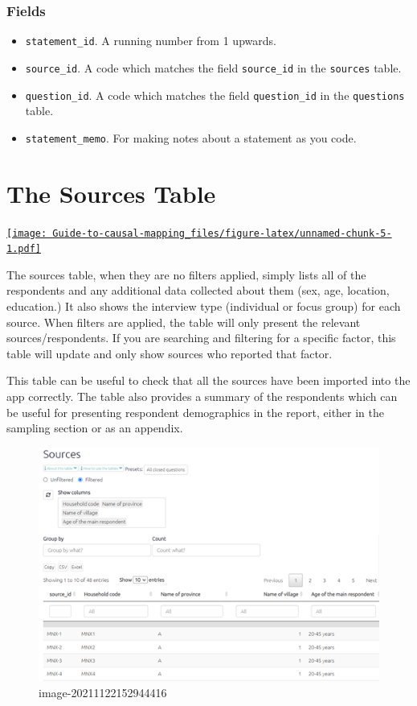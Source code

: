 \documentclass[
]{book}
\providecommand{\tightlist}{%
  \setlength{\itemsep}{0pt}\setlength{\parskip}{0pt}}
\begin{document}
\hypertarget{fields-1}{%
\subsection{Fields}\label{fields-1}}

\begin{itemize}
\tightlist
\item
  \texttt{statement\_id}. A running number from 1 upwards.
\item
  \texttt{source\_id}. A code which matches the field \texttt{source\_id} in the \texttt{sources} table.
\item
  \texttt{question\_id}. A code which matches the field \texttt{question\_id} in the \texttt{questions} table.
\item
  \texttt{statement\_memo}. For making notes about a statement as you code.
\end{itemize}

\hypertarget{xthe-sources-table}{%
\chapter{The Sources Table}\label{xthe-sources-table}}

\href{https://player.vimeo.com/video/596519456}{\texttt{[image: Guide-to-causal-mapping\_files/figure-latex/unnamed-chunk-5-1.pdf]}}

The sources table, when they are no filters applied, simply lists all of the respondents and any additional data collected about them (sex, age, location, education.) It also shows the interview type (individual or focus group) for each source. When filters are applied, the table will only present the relevant sources/respondents. If you are searching and filtering for a specific factor, this table will update and only show sources who reported that factor.

This table can be useful to check that all the sources have been imported into the app correctly. The table also provides a summary of the respondents which can be useful for presenting respondent demographics in the report, either in the sampling section or as an appendix.

\begin{figure}
\centering
\includegraphics[width=6.77083in,height=\textheight]{_assets/image-20211122152944416.png}
\caption{image-20211122152944416}
\end{figure}
\end{document}
